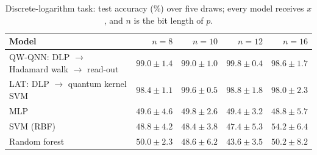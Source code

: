\begin{table}[htbp]
\centering
\caption[Discrete-logarithm task: main comparison]{Discrete-logarithm task: test accuracy (\%) over five draws; every model receives $x$, and $n$ is the bit length of $p$.}
\label{tab:latmain}
\begin{tabular}{lrrrr}
\hline
Model & $n=8$ & $n=10$ & $n=12$ & $n=16$ \\
\hline
QW-QNN: DLP $\to$ Hadamard walk $\to$ read-out & $99.0 \pm 1.4$ & $99.0 \pm 1.0$ & $99.8 \pm 0.4$ & $98.6 \pm 1.7$ \\
LAT: DLP $\to$ quantum kernel SVM & $98.4 \pm 1.1$ & $99.6 \pm 0.5$ & $98.8 \pm 1.8$ & $98.0 \pm 2.3$ \\
MLP & $49.6 \pm 4.6$ & $49.8 \pm 2.6$ & $49.4 \pm 3.2$ & $48.8 \pm 5.7$ \\
SVM (RBF) & $48.8 \pm 4.2$ & $48.4 \pm 3.8$ & $47.4 \pm 5.3$ & $54.2 \pm 6.4$ \\
Random forest & $50.0 \pm 2.3$ & $48.6 \pm 6.2$ & $43.6 \pm 3.5$ & $50.2 \pm 8.2$ \\
\hline
\end{tabular}
\end{table}
